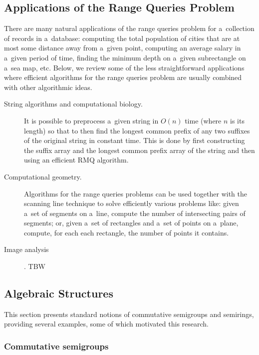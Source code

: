 \documentclass[11pt,letterpaper]{article}
\begin{document}
\subsection{Applications of the Range Queries Problem}\label{subseq:rmqapp}
There are many natural applications of the range queries problem for a~collection of records in a~database: computing the total population of cities that are at most some distance away from a~given point, computing an average salary in a~given period of time, finding the minimum depth on a~given subrectangle on a~sea map, etc. Below, we review some of the less straightforward applications where efficient algorithms for the range queries problem are usually combined with other algorithmic ideas.
\begin{description}
\item[String algorithms and computational biology.]
It is possible to preprocess a~given string in $O(n)$ time (where $n$ is its length) so that to then find the longest common prefix of any two suffixes of the original string in constant time. This is done by first constructing the suffix array and the longest common prefix array of the string and then using an efficient RMQ algorithm.

\item[Computational geometry.] Algorithms for the range queries problems can be used together with the scanning line technique{} to solve efficiently various problems like: given a~set of segments on a~line, compute the number of intersecting pairs of segments; or, given a~set of rectangles and a~set of points on a~plane, compute, for each each rectangle, the number of points it contains. 

\item[Image analysis]. TBW

\end{description}

\subsection{Algebraic Structures}\label{subsec:algstr}

This section presents standard notions of commutative semigroups and semirings,
providing several examples, some of which motivated this research.

\subsubsection{Commutative semigroups}
\end{document}
